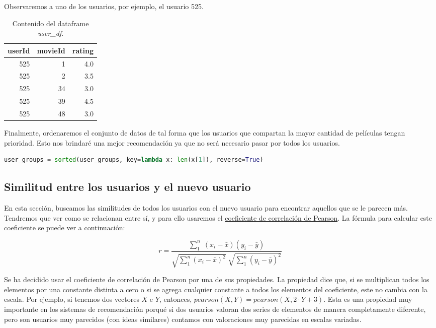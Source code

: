 \documentclass{uimppracticas}
\begin{document}
Observaremos a uno de los usuarios, por ejemplo, el usuario 525.

\begin{table}[h]
	\centering
	\begin{tabular}{rrr}
		\toprule
		userId &  movieId &  rating \\
		\midrule
		525 &        1 &     4.0 \\
		525 &        2 &     3.5 \\
		525 &       34 &     3.0 \\
		525 &       39 &     4.5 \\
		525 &       48 &     3.0 \\
		\bottomrule
	\end{tabular}
	\caption{Contenido del dataframe \textit{user\_df}.}
	\label{user_525}
\end{table}

Finalmente, ordenaremos el conjunto de datos de tal forma que los usuarios que compartan la mayor cantidad de películas tengan prioridad. Esto nos brindaré una mejor recomendación ya que no será necesario pasar por todos los usuarios. 

\begin{lstlisting}[language=python]
user_groups = sorted(user_groups, key=lambda x: len(x[1]), reverse=True)
\end{lstlisting}

\subsection{Similitud entre los usuarios y el nuevo usuario}

En esta sección, buscamos las similitudes de todos los usuarios con el nuevo usuario para encontrar aquellos que se le parecen más. Tendremos que ver como se relacionan entre sí, y para ello usaremos el \href{https://es.wikipedia.org/wiki/Coeficiente_de_correlaci\%C3\%B3n_de_Pearson}{coeficiente de correlación de Pearson}. La fórmula para calcular este coeficiente se puede ver a continuación:

\begin{equation}\label{formula}
	r = \frac{\sum_{1}^{n} \; (x_{i} - \bar{x}) (y_{i} - \bar{y})}{\sqrt{\sum_{1}^{n}(x_{i} - \bar{x})^2} \; \sqrt{\sum_{1}^{n}(y_{i} - \bar{y})^2}}
\end{equation}

Se ha decidido usar el coeficiente de correlación de Pearson por una de sus propiedades. La propiedad dice que, si se multiplican todos los elementos por una constante distinta a cero o si se agrega cualquier constante a todos los elementos del coeficiente, este no cambia con la escala. Por ejemplo, si tenemos dos vectores $X$ e $Y$, entonces, $pearson(X,Y) = pearson(X,2\cdot Y+3)$. Esta es una propiedad muy importante en los sistemas de recomendación porqué si dos usuarios valoran dos series de elementos de manera completamente diferente, pero son usuarios muy parecidos (con ideas similares) contamos con valoraciones muy parecidas en escalas variadas.
\end{document}
